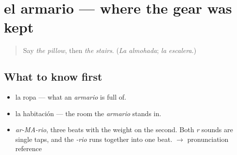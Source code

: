 \section[el armario]{el armario — where the gear was kept}

\label{lesson:ES-C366-armario}



\begin{quote}
Say \emph{the pillow}, then \emph{the stairs}. (\emph{La almohada}; \emph{la escalera}.)
\end{quote}

\subsection*{What to know first}
\begin{itemize}
\raggedright
  \item la ropa — what an \emph{armario} is full of.
  \item la habitación — the room the \emph{armario} stands in.
\end{itemize}

\begin{sounds}
\begin{itemize}
\raggedright
  \item \emph{ar-MA-rio}, three beats with the weight on the second. Both \emph{r} sounds are single taps, and the \emph{-rio} runs together into one beat. $\to$ pronunciation reference
\end{itemize}
\end{sounds}

